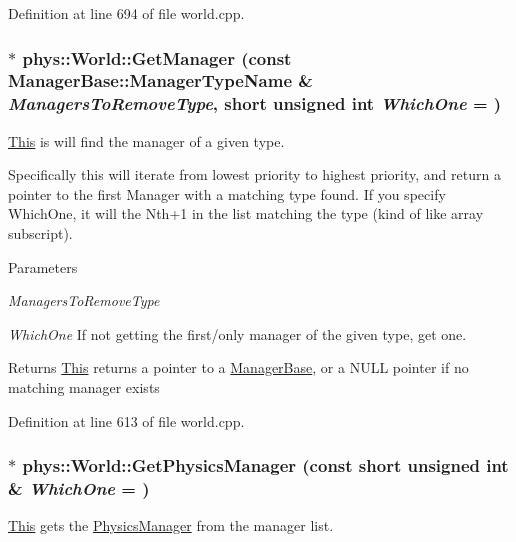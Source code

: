Definition at line 694 of file world.cpp.

\hypertarget{classphys_1_1World_a910befc904c0d0e73b913dedd08e9d98}{
\subsubsection[{GetManager}]{ $\ast$ phys::World::GetManager (const {\bf ManagerBase::ManagerTypeName} \& {\em ManagersToRemoveType}, \/  short unsigned int {\em WhichOne} = {})}}
\label{da/ddf/classphys_1_1World_a910befc904c0d0e73b913dedd08e9d98}


\hyperlink{structThis}{This} is will find the manager of a given type. 

Specifically this will iterate from lowest priority to highest priority, and return a pointer to the first Manager with a matching type found. If you specify WhichOne, it will the Nth+1 in the list matching the type (kind of like array subscript). 
\begin{DoxyParams}{Parameters}
\item[{\em ManagersToRemoveType}]\item[{\em WhichOne}]If not getting the first/only manager of the given type, get one. \end{DoxyParams}
\begin{DoxyReturn}{Returns}
\hyperlink{structThis}{This} returns a pointer to a \hyperlink{classphys_1_1ManagerBase}{ManagerBase}, or a NULL pointer if no matching manager exists 
\end{DoxyReturn}


Definition at line 613 of file world.cpp.

\hypertarget{classphys_1_1World_a1b9eb6206ee15c2ef49665a07de3d83c}{
\subsubsection[{GetPhysicsManager}]{ $\ast$ phys::World::GetPhysicsManager (const short unsigned int \& {\em WhichOne} = {})}}
\label{da/ddf/classphys_1_1World_a1b9eb6206ee15c2ef49665a07de3d83c}


\hyperlink{structThis}{This} gets the \hyperlink{classphys_1_1PhysicsManager}{PhysicsManager} from the manager list. 


